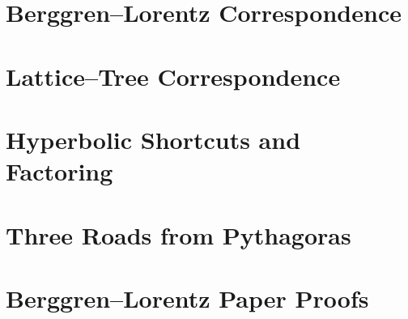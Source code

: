 \section{Berggren--Lorentz Correspondence}
\label{app:01-BerggrenLorentzCorrespondence}



\clearpage

\section{Lattice--Tree Correspondence}
\label{app:02-LatticeTreeCorrespondence}



\clearpage

\section{Hyperbolic Shortcuts and Factoring}
\label{app:03-HyperbolicShortcutsFactoring}



\clearpage

\section{Three Roads from Pythagoras}
\label{app:04-ThreeRoadsFromPythagoras}



\clearpage

\section{Berggren--Lorentz Paper Proofs}
\label{app:05-BerggrenLorentzPaperProofs}

